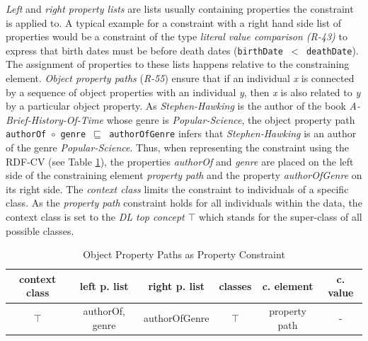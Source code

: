 \documentclass[a4paper,fontsize=11pt]{scrartcl}
\newcommand{\ms}[1]{\texttt{#1}}
\begin{document}
\emph{Left} and \emph{right property lists} are lists usually containing properties the constraint is applied to. A typical example for a constraint with a right hand side list of properties would be a constraint of the type \emph{literal value comparison (R-43)} to express that birth dates must be before death dates ({\small\ms{birthDate $<$ deathDate}}). The assignment of properties to these lists happens relative to the constraining element.
\emph{Object property paths} (\emph{R-55}) ensure that if an individual \emph{x} is connected by a sequence of object properties with an individual \emph{y}, 
then \emph{x} is also related to \emph{y} by a particular object property. 
As \emph{Stephen-Hawking} is the author of the book \emph{A-Brief-History-Of-Time} 
whose genre is \emph{Popular-Science}, 
the object property path {\small\ms{authorOf $\circ$ genre $\sqsubseteq$ authorOfGenre}} infers that \emph{Stephen-Hawking} is an author of the genre \emph{Popular-Science}. 
Thus, when representing the constraint using the RDF-CV (see Table \ref{tab:property-constraint-object-property-paths}), the properties \emph{authorOf} and \emph{genre} are placed on the left side of the constraining element \emph{property path}
and the property \emph{authorOfGenre} on its right side. The \emph{context class} limits the constraint to individuals of a specific class. As the \emph{property path} constraint holds for all individuals within the data, the context class is set to the \emph{DL top concept} $\top$ which stands for the super-class of all possible classes.
\begin{table}[H]
  \scriptsize
  \sffamily
  \vspace{0cm}
	\caption{Object Property Paths as Property Constraint}
	\label{tab:property-constraint-object-property-paths}
	\centering
		\begin{tabular}{c|c|c|c|c|c}
      \textbf{context class} & \textbf{left p. list} & \textbf{right p. list} & \textbf{classes} & \textbf{c. element} & \textbf{c. value} \\
      \hline
      $\top$ & authorOf, genre & authorOfGenre & $\top$ & property path & - \\
		\end{tabular}
\end{table}
\end{document}

